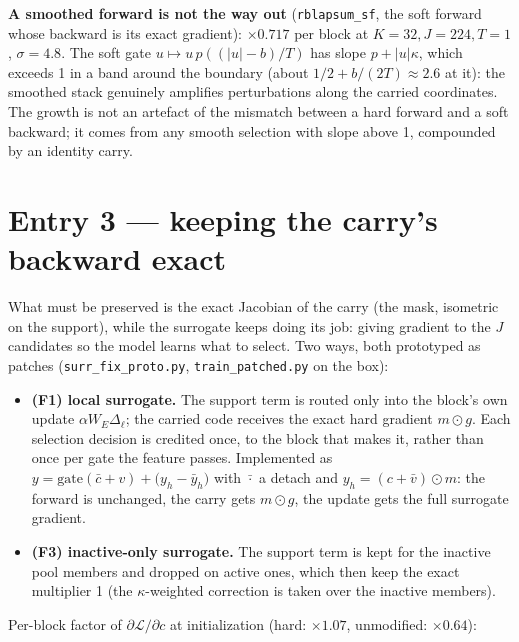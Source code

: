 \documentclass[11pt,a4paper]{article}
\newcommand{\code}[1]{\texttt{#1}}
\begin{document}
\textbf{A smoothed forward is not the way out} (\code{rblapsum\_sf}, the soft forward whose backward is its exact
gradient): \(\times0.717\) per block at \(K=32,J=224,T=1\), \(\sigma=4.8\).  The soft gate \(u\mapsto u\,p((|u|-b)/T)\)
has slope \(p+|u|\kappa\), which exceeds 1 in a band around the boundary (about \(1/2+b/(2T)\approx2.6\) at it): the
smoothed stack genuinely amplifies perturbations along the carried coordinates.  The growth is not an artefact of
the mismatch between a hard forward and a soft backward; it comes from any smooth selection with slope above 1,
compounded by an identity carry.

\section{Entry 3 --- keeping the carry's backward exact}

What must be preserved is the exact Jacobian of the carry (the mask, isometric on the support), while the
surrogate keeps doing its job: giving gradient to the \(J\) candidates so the model learns what to select.  Two
ways, both prototyped as patches (\code{surr\_fix\_proto.py}, \code{train\_patched.py} on the box):

\begin{itemize}[leftmargin=1.2em]
\item \textbf{(F1) local surrogate.}  The support term is routed only into the block's own update
  \(\alpha W_E\Delta_\ell\); the carried code receives the exact hard gradient \(m\odot g\).  Each selection
  decision is credited once, to the block that makes it, rather than once per gate the feature passes.
  Implemented as \(y=\mathrm{gate}(\bar c+v)+\bigl(y_h-\bar y_h\bigr)\) with \(\bar{\cdot}\) a detach and
  \(y_h=(c+\bar v)\odot m\): the forward is unchanged, the carry gets \(m\odot g\), the update gets the full
  surrogate gradient.
\item \textbf{(F3) inactive-only surrogate.}  The support term is kept for the inactive pool members and dropped on
  active ones, which then keep the exact multiplier 1 (the \(\kappa\)-weighted correction is taken over the
  inactive members).
\end{itemize}

Per-block factor of \(\partial\mathcal L/\partial c\) at initialization (hard: \(\times1.07\), unmodified: \(\times0.64\)):
\end{document}
